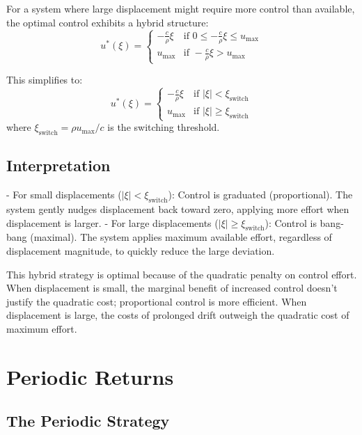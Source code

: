 \documentclass[12pt]{article}
\begin{document}
For a system where large displacement might require more control than available, the optimal control exhibits a hybrid structure:
\begin{equation}
u^*(\xi) = \begin{cases}
-\frac{c}{\rho} \xi & \text{if } 0 \leq -\frac{c}{\rho} \xi \leq u_{\max} \\
u_{\max} & \text{if } -\frac{c}{\rho} \xi > u_{\max}
\end{cases}
\end{equation}

This simplifies to:
\begin{equation}
u^*(\xi) = \begin{cases}
-\frac{c}{\rho} \xi & \text{if } |\xi| < \xi_{\text{switch}} \\
u_{\max} & \text{if } |\xi| \geq \xi_{\text{switch}}
\end{cases}
\end{equation}
where $\xi_{\text{switch}} = \rho u_{\max} / c$ is the switching threshold.

\subsection{Interpretation}

- For small displacements ($|\xi| < \xi_{\text{switch}}$): Control is graduated (proportional). The system gently nudges displacement back toward zero, applying more effort when displacement is larger.
- For large displacements ($|\xi| \geq \xi_{\text{switch}}$): Control is bang-bang (maximal). The system applies maximum available effort, regardless of displacement magnitude, to quickly reduce the large deviation.

This hybrid strategy is optimal because of the quadratic penalty on control effort. When displacement is small, the marginal benefit of increased control doesn't justify the quadratic cost; proportional control is more efficient. When displacement is large, the costs of prolonged drift outweigh the quadratic cost of maximum effort.

\section{Periodic Returns}

\subsection{The Periodic Strategy}
\end{document}
